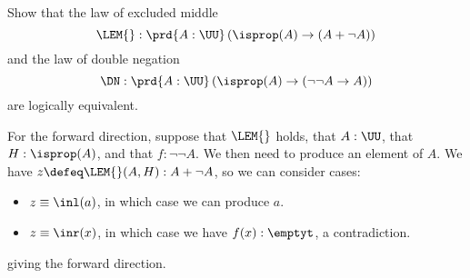 Show that the law of excluded middle
\[
  \LEM{} : \prd{A:\UU} \left( \isprop(A) \to (A + \lnot A)\right)
\]
and the law of double negation
\[
  \DN : \prd{A:\UU} \left( \isprop(A) \to (\lnot\lnot A \to A)\right)
\]
are logically equivalent.


 \soln
For the forward direction, suppose that $\LEM{}$ holds, that $A : \UU$,
that $H : \isprop(A)$, and that $f : \lnot\lnot A$.  We then need to produce an
element of $A$.  We have $z \defeq \LEM{}(A, H) : A + \lnot A$, so we can
consider cases:



\begin{itemize}
\item  $z \equiv \inl(a)$, in which case we can produce $a$.

\item  $z \equiv \inr(x)$, in which case we have $f(x) : \emptyt$, a contradiction.

\end{itemize}
giving the forward direction.


